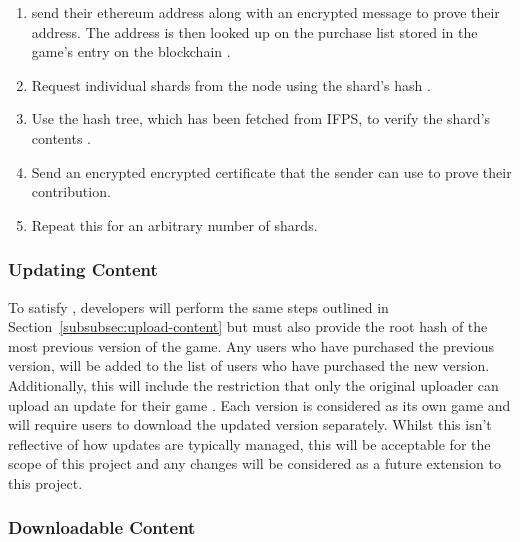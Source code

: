 \begin{enumerate}
  \item send their ethereum address along with an encrypted message to prove their address. The address is then looked up on the purchase list stored in the game's entry on the blockchain .
  \item Request individual shards from the node using the shard's hash .
  \item Use the hash tree, which has been fetched from IFPS, to verify the shard's contents .
  \item Send an encrypted encrypted certificate that the sender can use to prove their contribution.
  \item Repeat this for an arbitrary number of shards.
\end{enumerate}

\subsubsection*{Updating Content}

To satisfy , developers will perform the same steps outlined in Section~\ref{subsubsec:upload-content} but must also provide the root hash of the most previous version of the game. Any users who have purchased the previous version, will be added to the list of users who have purchased the new version. Additionally, this will include the restriction that only the original uploader can upload an update for their game .
\x
Each version is considered as its own game and will require users to download the updated version separately. Whilst this isn't reflective of how updates are typically managed, this will be acceptable for the scope of this project and any changes will be considered as a future extension to this project.

\subsubsection*{Downloadable Content}
\tbd



